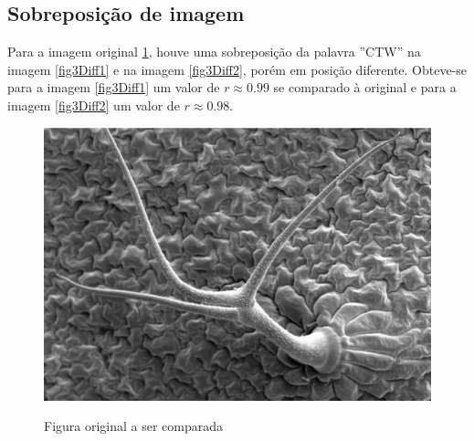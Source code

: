 \documentclass[10pt,a4paper]{article}
\begin{document}
\newpage
\subsection{Sobreposição de imagem}
Para a imagem original \ref{fig3}, houve uma sobreposição da palavra
''CTW'' na imagem \ref{fig3Diff1} e na imagem \ref{fig3Diff2},
porém em posição diferente. Obteve-se para a imagem \ref{fig3Diff1}
um valor de $r\approx 0.99$ se comparado à original e para a imagem \ref{fig3Diff2} 
um valor de $r\approx 0.98$.
\begin{figure}[h!]
\begin{center}
\includegraphics[scale=0.25]{photos/m15_tricome}\label{fig3}
\caption{Figura original a ser comparada}
\end{center}
\end{figure}
\end{document}
